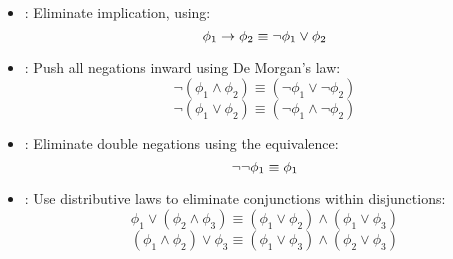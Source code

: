 
    \begin{itemize}
      \item {}: Eliminate implication, using:
        \[
          \phi_1 \rightarrow \phi_2 \equiv \lnot \phi_1 \lor \phi_2
        \]
      \item {}: Push all negations inward using De Morgan's law:
        \[
          \lnot (\phi_1 \land \phi_2) \equiv (\lnot \phi_1 \lor \lnot \phi_2)
        \]
        \[
          \lnot (\phi_1 \lor \phi_2) \equiv (\lnot \phi_1 \land \lnot \phi_2)
        \]
      \item {}: Eliminate double negations using the equivalence:
        \[
          \lnot \lnot \phi_1 \equiv \phi_1
        \]
      \item {}: Use distributive laws to eliminate conjunctions within disjunctions:
        \[
          \phi_1 \lor (\phi_2 \land \phi_3) \equiv (\phi_1 \lor \phi_2) \land (\phi_1 \lor \phi_3)
        \]
        \[
          (\phi_1 \land \phi_2) \lor \phi_3 \equiv (\phi_1 \lor \phi_3) \land (\phi_2 \lor \phi_3)
        \]
    \end{itemize}

